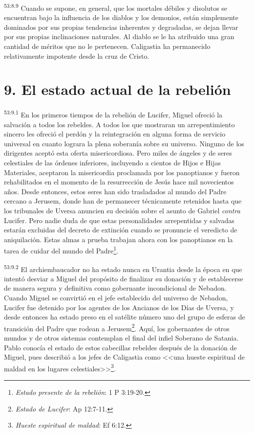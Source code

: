 \par
\textsuperscript{53:8.9} Cuando se supone, en general, que los mortales débiles y disolutos se encuentran bajo la influencia de los diablos y los demonios, están simplemente dominados por sus propias tendencias inherentes y degradadas, se dejan llevar por sus propias inclinaciones naturales. Al diablo se le ha atribuido una gran cantidad de méritos que no le pertenecen. Caligastia ha permanecido relativamente impotente desde la cruz de Cristo.

\section*{9. El estado actual de la rebelión}
\par
\textsuperscript{53:9.1} En los primeros tiempos de la rebelión de Lucifer, Miguel ofreció la salvación a todos los rebeldes. A todos los que mostraran un arrepentimiento sincero les ofreció el perdón y la reintegración en alguna forma de servicio universal en cuanto lograra la plena soberanía sobre su universo. Ninguno de los dirigentes aceptó esta oferta misericordiosa. Pero miles de ángeles y de seres celestiales de las órdenes inferiores, incluyendo a cientos de Hijos e Hijas Materiales, aceptaron la misericordia proclamada por los panoptianos y fueron rehabilitados en el momento de la resurrección de Jesús hace mil novecientos años. Desde entonces, estos seres han sido trasladados al mundo del Padre cercano a Jerusem, donde han de permanecer técnicamente retenidos hasta que los tribunales de Uversa anuncien su decisión sobre el asunto de Gabriel \textit{contra} Lucifer. Pero nadie duda de que estas personalidades arrepentidas y salvadas estarán excluidas del decreto de extinción cuando se pronuncie el veredicto de aniquilación. Estas almas a prueba trabajan ahora con los panoptianos en la tarea de cuidar del mundo del Padre\footnote{\textit{Estado presente de la rebelión}: 1 P 3:19-20.}.

\par
\textsuperscript{53:9.2} El archiembaucador no ha estado nunca en Urantia desde la época en que intentó desviar a Miguel del propósito de finalizar su donación y de establecerse de manera segura y definitiva como gobernante incondicional de Nebadon. Cuando Miguel se convirtió en el jefe establecido del universo de Nebadon, Lucifer fue detenido por los agentes de los Ancianos de los Días de Uversa, y desde entonces ha estado preso en el satélite número uno del grupo de esferas de transición del Padre que rodean a Jerusem\footnote{\textit{Estado de Lucifer}: Ap 12:7-11.}. Aquí, los gobernantes de otros mundos y de otros sistemas contemplan el final del infiel Soberano de Satania. Pablo conocía el estado de estos cabecillas rebeldes después de la donación de Miguel, pues describió a los jefes de Caligastia como <<una hueste espiritual de maldad en los lugares celestiales>>\footnote{\textit{Hueste espiritual de maldad}: Ef 6:12.}.

